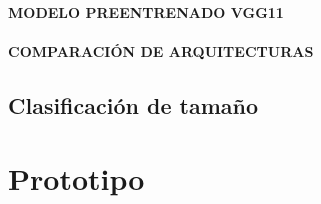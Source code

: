 			\subsubsection{\MakeUppercase{Modelo preentrenado VGG11}}
			\subsubsection{\MakeUppercase{Comparación de arquitecturas}}
		
	\section{Clasificación de tamaño}
	
\chapter{Prototipo}
	

	















